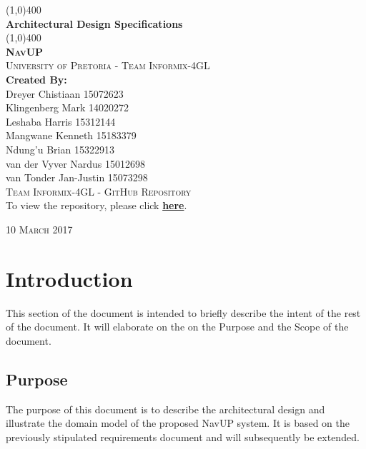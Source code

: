 \documentclass{article}
\begin{document}
	\begin{titlepage}
		\begin{center}

			\line(1,0){400}\\
			[6mm]
			\huge{
				\bfseries Architectural Design Specifications
			}\\
			[2mm]
			\line(1,0){400}\\
			[15mm]
			\textsc{\large{\textbf{NavUP}}}\\
			[4.5mm]
			\textsc{\large University of Pretoria - Team Informix-4GL}\\
			[20mm]
			\large{\textbf{Created By:}}\\
			[2mm]
			\large{
				Dreyer Chistiaan 15072623 \\
				Klingenberg Mark  14020272\\
				Leshaba Harris 15312144 \\
				Mangwane Kenneth 15183379 \\
				Ndung'u Brian 15322913 \\
				van der Vyver Nardus 15012698 \\
				van Tonder Jan-Justin 15073298
			}\\
			[30mm]
			
		\textsc{\Large Team Informix-4GL - GitHub Repository}\\[2mm]
			To view the repository, please click 
		\href{https://github.com/MarkKlingenberg/Informix-4gl}{\textbf{here}}. \\[45mm]
		\end{center}
		\begin{flushright}
			\textsc{\large 10 March 2017}
		\end{flushright}
	\end{titlepage}

	\cleardoublepage
	\thispagestyle{empty}
	\tableofcontents
	\cleardoublepage

	\thispagestyle{empty}
	\listoffigures
	\cleardoublepage
	\setcounter{page}{1}
	
	\section{Introduction}\label{sec: introduction}
		This section of the document is intended to briefly describe the intent of the rest of the document. It will elaborate on the on the Purpose and the Scope of the document.
		
		\subsection{Purpose}\label{sec: purpose}
			The purpose of this document is to describe the architectural design and illustrate the domain model of the proposed NavUP system. It is based on the previously stipulated requirements document and will subsequently be extended.\\
			
\end{document}
